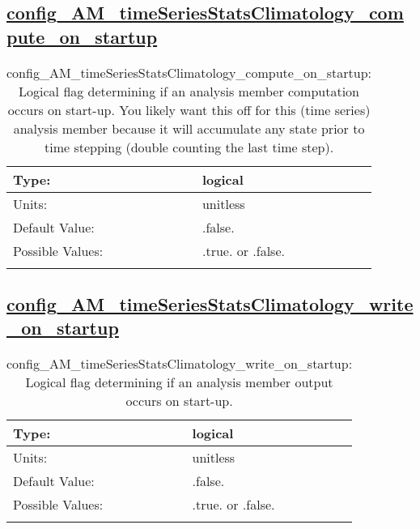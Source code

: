 \subsection[config\_AM\_timeSeriesStatsClimatology\_compute\_on\_startup]{\hyperref[sec:nm_tab_AM_timeSeriesStatsClimatology]{config\_AM\_timeSeriesStatsClimatology\_compute\_on\_startup}}
\label{subsec:nm_sec_config_AM_timeSeriesStatsClimatology_compute_on_startup}
\begin{center}
\begin{longtable}{| p{2.0in} || p{4.0in} |}
    \hline
    Type: & logical \\
    \hline
    Units: & \si{unitless} \\
    \hline
    Default Value: & .false. \\
    \hline
    Possible Values: & .true. or .false. \\
    \hline
    \caption{config\_AM\_timeSeriesStatsClimatology\_compute\_on\_startup: Logical flag determining if an analysis member computation occurs on start-up. You likely want this off for this (time series) analysis member because it will accumulate any state prior to time stepping (double counting the last time step).}
\end{longtable}
\end{center}
\subsection[config\_AM\_timeSeriesStatsClimatology\_write\_on\_startup]{\hyperref[sec:nm_tab_AM_timeSeriesStatsClimatology]{config\_AM\_timeSeriesStatsClimatology\_write\_on\_startup}}
\label{subsec:nm_sec_config_AM_timeSeriesStatsClimatology_write_on_startup}
\begin{center}
\begin{longtable}{| p{2.0in} || p{4.0in} |}
    \hline
    Type: & logical \\
    \hline
    Units: & \si{unitless} \\
    \hline
    Default Value: & .false. \\
    \hline
    Possible Values: & .true. or .false. \\
    \hline
    \caption{config\_AM\_timeSeriesStatsClimatology\_write\_on\_startup: Logical flag determining if an analysis member output occurs on start-up.}
\end{longtable}
\end{center}
